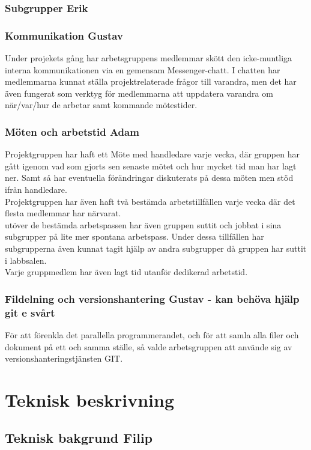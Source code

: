 \documentclass{article}
\begin{document}
\subsubsection{Subgrupper Erik}
\subsubsection{Kommunikation Gustav}
Under projekets gång har arbetsgruppens medlemmar skött den icke-muntliga interna kommunikationen 
via en gemensam Messenger-chatt. I chatten har medlemmarna kunnat ställa projektrelaterade frågor till 
varandra, men det har även fungerat som verktyg för medlemmarna att uppdatera varandra om när/var/hur de 
arbetar samt kommande mötestider.
\subsubsection{Möten och arbetstid Adam}
Projektgruppen har haft ett Möte med handledare varje vecka, där
gruppen har gått igenom vad som gjorts sen senaste mötet och hur
mycket tid man har lagt ner. Samt så har eventuella förändringar
diskuterats på dessa möten men stöd ifrån handledare.\\
Projektgruppen har även haft två bestämda arbetstillfällen varje
vecka där det flesta medlemmar har närvarat. \\
utöver de bestämda arbetspassen har även gruppen suttit och 
jobbat i sina subgrupper på lite mer spontana arbetspass. Under
dessa tillfällen har subgrupperna även kunnat tagit hjälp av 
andra subgrupper då gruppen har suttit i labbsalen.\\
Varje gruppmedlem har även lagt tid utanför dedikerad arbetstid.  

\subsubsection{Fildelning och versionshantering Gustav - kan behöva hjälp git e svårt}
För att förenkla det parallella programmerandet, och för att samla alla filer och dokument 
på ett och samma ställe, så valde arbetsgruppen att använde sig av versionshanteringstjänsten GIT.


\section{Teknisk beskrivning} %
\subsection{Teknisk bakgrund Filip}
\end{document}
